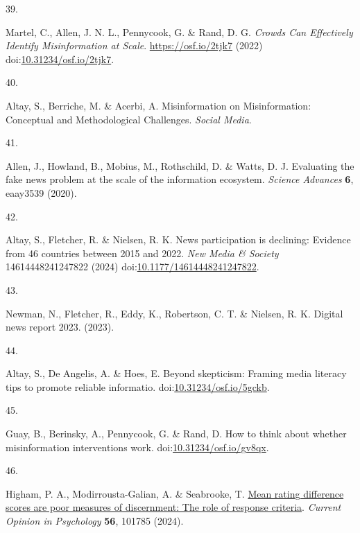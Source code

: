 \documentclass[
  doc,floatsintext]{apa6}
\newlength{\cslhangindent}
\newlength{\csllabelwidth}
\newenvironment{CSLReferences}[2] %
 {\begin{list}{}{%
  \setlength{\itemindent}{0pt}
  \setlength{\leftmargin}{0pt}
  \setlength{\parsep}{0pt}
  \ifodd #1
   \setlength{\leftmargin}{\cslhangindent}
   \setlength{\itemindent}{-1\cslhangindent}
  \fi
  \setlength{\itemsep}{#2\baselineskip}}}
 {\end{list}}
\newcommand{\CSLLeftMargin}[1]{\parbox[t]{\csllabelwidth}{\strut#1\strut}}
\newcommand{\CSLRightInline}[1]{\parbox[t]{\linewidth - \csllabelwidth}{\strut#1\strut}}
\begin{document}
\begin{CSLReferences}{0}{0}
\CSLLeftMargin{39. }%
\CSLRightInline{Martel, C., Allen, J. N. L., Pennycook, G. \& Rand, D. G. \emph{Crowds Can Effectively Identify Misinformation at Scale}. \url{https://osf.io/2tjk7} (2022) doi:\href{https://doi.org/10.31234/osf.io/2tjk7}{10.31234/osf.io/2tjk7}.}

\CSLLeftMargin{40. }%
\CSLRightInline{Altay, S., Berriche, M. \& Acerbi, A. Misinformation on Misinformation: Conceptual and Methodological Challenges. \emph{Social Media}.}

\CSLLeftMargin{41. }%
\CSLRightInline{Allen, J., Howland, B., Mobius, M., Rothschild, D. \& Watts, D. J. Evaluating the fake news problem at the scale of the information ecosystem. \emph{Science Advances} \textbf{6}, eaay3539 (2020).}

\CSLLeftMargin{42. }%
\CSLRightInline{Altay, S., Fletcher, R. \& Nielsen, R. K. News participation is declining: Evidence from 46 countries between 2015 and 2022. \emph{New Media \& Society} 14614448241247822 (2024) doi:\href{https://doi.org/10.1177/14614448241247822}{10.1177/14614448241247822}.}

\CSLLeftMargin{43. }%
\CSLRightInline{Newman, N., Fletcher, R., Eddy, K., Robertson, C. T. \& Nielsen, R. K. Digital news report 2023. (2023).}

\CSLLeftMargin{44. }%
\CSLRightInline{Altay, S., De Angelis, A. \& Hoes, E. Beyond skepticism: Framing media literacy tips to promote reliable informatio. doi:\href{https://doi.org/10.31234/osf.io/5gckb}{10.31234/osf.io/5gckb}.}

\CSLLeftMargin{45. }%
\CSLRightInline{Guay, B., Berinsky, A., Pennycook, G. \& Rand, D. How to think about whether misinformation interventions work. doi:\href{https://doi.org/10.31234/osf.io/gv8qx}{10.31234/osf.io/gv8qx}.}

\CSLLeftMargin{46. }%
\CSLRightInline{Higham, P. A., Modirrousta-Galian, A. \& Seabrooke, T. \href{https://doi.org/10.1016/j.copsyc.2023.101785}{Mean rating difference scores are poor measures of discernment: The role of response criteria}. \emph{Current Opinion in Psychology} \textbf{56}, 101785 (2024).}


\end{CSLReferences}
\end{document}
